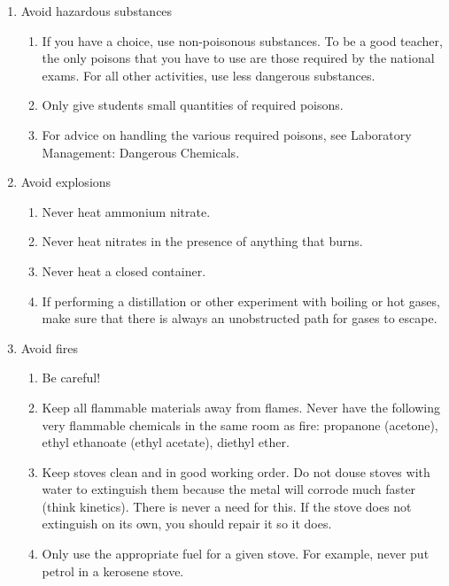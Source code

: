 \begin{enumerate}
\item{Avoid hazardous substances}
\begin{enumerate}
\item{If you have a choice, use non-poisonous substances. 
To be a good teacher, the only poisons that you have to use 
are those required by the national exams. 
For all other activities, use less dangerous substances.}
\item{Only give students small quantities of required poisons.}
\item{For advice on handling the various required poisons, 
see Laboratory Management: Dangerous Chemicals.}
\end{enumerate}

\item{Avoid explosions}
\begin{enumerate}
\item{Never heat ammonium nitrate.}
\item{Never heat nitrates in the presence of anything that burns.}
\item{Never heat a closed container.}
\item{If performing a distillation 
or other experiment with boiling or hot gases, 
make sure that there is always an unobstructed path for gases to escape.}
\end{enumerate}

\item{Avoid fires}
\begin{enumerate}
\item{Be careful!}
\item{Keep all flammable materials away from flames. 
Never have the following very flammable chemicals in the same room as fire: 
propanone (acetone), ethyl ethanoate (ethyl acetate), diethyl ether.}
\item{Keep stoves clean and in good working order. 
Do not douse stoves with water to extinguish them 
because the metal will corrode much faster (think kinetics). 
There is never a need for this. 
If the stove does not extinguish on its own, you should repair it so it does.}
\item{Only use the appropriate fuel for a given stove. 
For example, never put petrol in a kerosene stove.}
\end{enumerate}


\end{enumerate}
